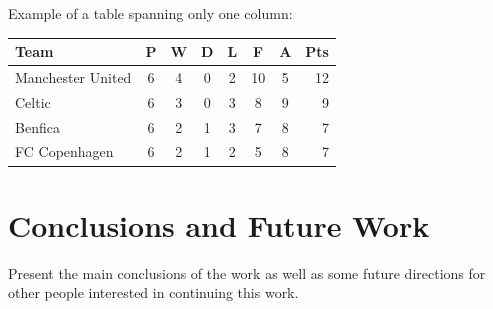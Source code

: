 \documentclass[10pt,twocolumn,letterpaper]{article}
\begin{document}
Example of a table spanning only one column:

\begin{table}
\begin{center}
\begin{tabular}{l*{6}{c}r}
Team              & P & W & D & L & F  & A & Pts \\
\hline
Manchester United & 6 & 4 & 0 & 2 & 10 & 5 & 12  \\
Celtic            & 6 & 3 & 0 & 3 &  8 & 9 &  9  \\
Benfica           & 6 & 2 & 1 & 3 &  7 & 8 &  7  \\
FC Copenhagen     & 6 & 2 & 1 & 2 &  5 & 8 &  7  \\
\end{tabular}
\end{center}
\end{table}

\section{Conclusions and Future Work}
Present the main conclusions of the work as well as some future directions for other people interested in continuing this work.

{\small


}
\end{document}
